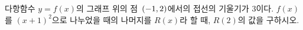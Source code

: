 다항함수 $y=f(x)$의 그래프 위의 점~$(-1{,}\mkern3mu\mathopen{}2)$에서의 접선의 기울기가 $3$이다. $f(x)$를 $(x+1)^2$으로 나누었을 때의 나머지를 $R(x)$라 할 때, $R(2)$의 값을 구하시오.
